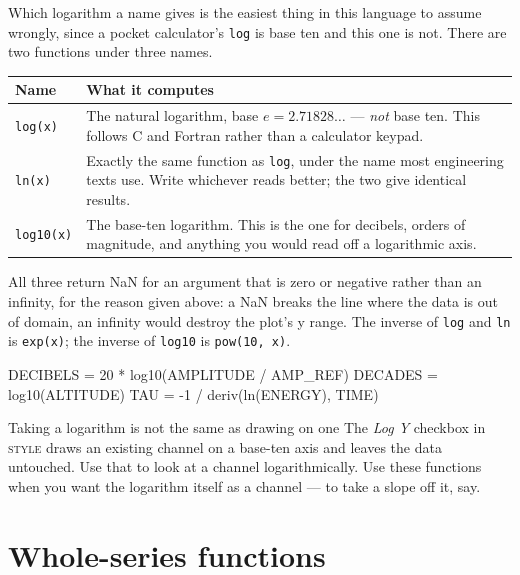 \documentclass[11pt,a4paper,oneside]{report}
\newcommand{\code}[1]{\texttt{#1}}
\newcommand{\tab}[1]{\textsc{#1}}
\begin{document}
Which logarithm a name gives is the easiest thing in this language to assume
wrongly, since a pocket calculator's \code{log} is base ten and this one is not.
There are two functions under three names.

\begin{center}
\small
\begin{tabular}{@{}p{}p{}@{}}
\toprule
\textbf{Name} & \textbf{What it computes} \\
\midrule
\code{log(x)} & The natural logarithm, base $e = 2.71828\ldots$ --- \emph{not} base ten. This follows C and Fortran rather than a calculator keypad. \\
\addlinespace
\code{ln(x)} & Exactly the same function as \code{log}, under the name most engineering texts use. Write whichever reads better; the two give identical results. \\
\addlinespace
\code{log10(x)} & The base-ten logarithm. This is the one for decibels, orders of magnitude, and anything you would read off a logarithmic axis. \\
\bottomrule
\end{tabular}
\end{center}

All three return NaN for an argument that is zero or negative rather than an
infinity, for the reason given above: a NaN breaks the line where the data is out
of domain, an infinity would destroy the plot's y range. The inverse of
\code{log} and \code{ln} is \code{exp(x)}; the inverse of \code{log10} is
\code{pow(10, x)}.

\begin{aoecode}
DECIBELS = 20 * log10(AMPLITUDE / AMP_REF)
DECADES  = log10(ALTITUDE)
TAU      = -1 / deriv(ln(ENERGY), TIME)
\end{aoecode}

\begin{aoenote}{Taking a logarithm is not the same as drawing on one}
The \emph{Log Y} checkbox in \tab{style} draws an existing channel on a base-ten
axis and leaves the data untouched. Use that to look at a channel
logarithmically. Use these functions when you want the logarithm itself as a
channel --- to take a slope off it, say.
\end{aoenote}

\section{Whole-series functions}
\end{document}
